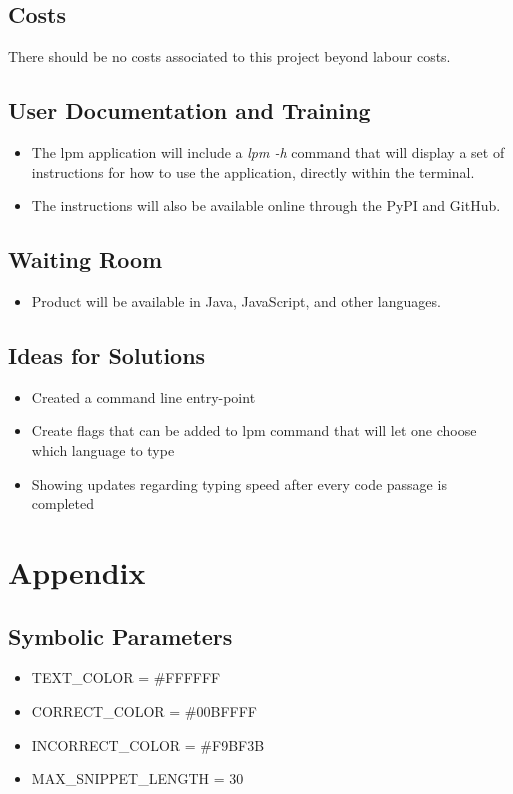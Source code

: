 \documentclass[12pt, titlepage]{article}
\begin{document}
\subsection{Costs}
There should be no costs associated to this project beyond labour costs.

\subsection{User Documentation and Training}
\begin{itemize}
    \item The lpm application will include a \textit{lpm -h} command that will display a set of instructions for how to use the application, directly within the terminal.
    \item The instructions will also be available online through the PyPI and GitHub.
\end{itemize}

\subsection{Waiting Room}
\begin{itemize}
    \item Product will be available in Java, JavaScript, and other languages.
\end{itemize}

\subsection{Ideas for Solutions}
\begin{itemize}
    \item Created a command line entry-point
    \item Create flags that can be added to lpm command that will let one choose which language to type
    \item Showing updates regarding typing speed after every code passage is completed
\end{itemize}






\newpage

\section{Appendix}

\subsection{Symbolic Parameters}

\begin{itemize}
    \item TEXT\_COLOR = \#FFFFFF
    \item CORRECT\_COLOR = \#00BFFFF
    \item INCORRECT\_COLOR = \#F9BF3B
    \item MAX\_SNIPPET\_LENGTH = 30
\end{itemize}
\end{document}
